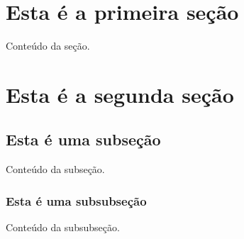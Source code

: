\documentclass{article}
\begin{document}
\section{Esta é a primeira seção}
Conteúdo da seção.

\section{Esta é a segunda seção}
\subsection{Esta é uma subseção}
Conteúdo da subseção.

\subsubsection{Esta é uma subsubseção}
Conteúdo da subsubseção.
\end{document}
